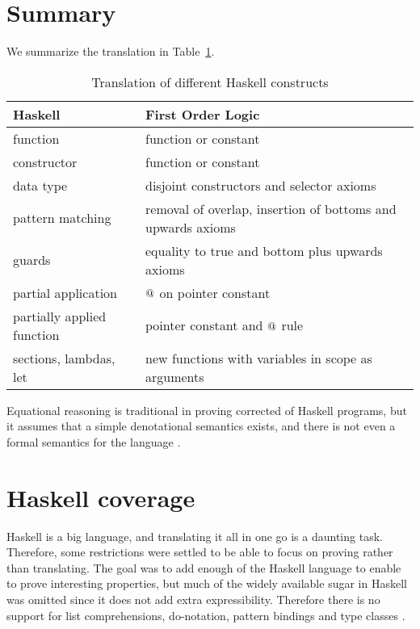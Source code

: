 \section{Summary}

We summarize the translation in Table~\ref{tab:transtable}.

\begin{table}[h]
  \centering
  \begin{tabular}{|l|l|}
    \hline
    Haskell                    & First Order Logic \\
    \hline
    function                   & function or constant \\
    constructor                & function or constant \\
    data type                  & disjoint constructors and selector axioms \\
    pattern matching           & removal of overlap, insertion of bottoms and upwards axioms \\
    guards                     & equality to true and bottom plus upwards axioms \\
    partial application        & $@$ on pointer constant \\
    partially applied function & pointer constant and $@$ rule \\
    sections, lambdas, let     & new functions with variables in scope as arguments \\
    \hline
  \end{tabular}
  \caption{Translation of different Haskell constructs
    \label{tab:transtable}
  }
\end{table}

Equational reasoning is traditional in proving corrected of Haskell
programs, but it assumes that a simple denotational semantics exists,
and there is not even a formal semantics for the language
\cite{chasingbot}.

\section{Haskell coverage}

Haskell is a big language, and translating it all in one go is a
daunting task. Therefore, some restrictions were settled to be able to
focus on proving rather than translating.    The goal was to add enough of the Haskell language to
enable to prove interesting properties, but much of the widely
available sugar in Haskell was omitted since it does not add extra
expressibility. Therefore there is no support for list comprehensions,
do-notation, pattern bindings and type classes .

